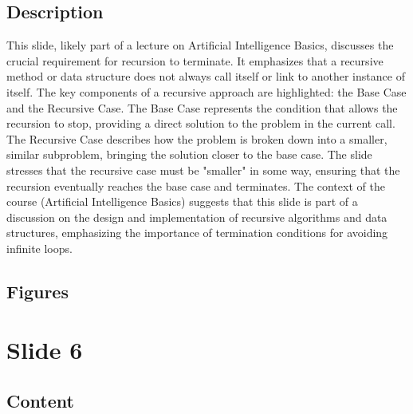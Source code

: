 \documentclass{article}%
\begin{document}
\subsection{Description}%
This slide, likely part of a lecture on Artificial Intelligence Basics, discusses the crucial requirement for recursion to terminate.  It emphasizes that a recursive method or data structure does not always call itself or link to another instance of itself.  The key components of a recursive approach are highlighted: the Base Case and the Recursive Case.  The Base Case represents the condition that allows the recursion to stop, providing a direct solution to the problem in the current call.  The Recursive Case describes how the problem is broken down into a smaller, similar subproblem, bringing the solution closer to the base case.  The slide stresses that the recursive case must be "smaller" in some way, ensuring that the recursion eventually reaches the base case and terminates.  The context of the course (Artificial Intelligence Basics) suggests that this slide is part of a discussion on the design and implementation of recursive algorithms and data structures, emphasizing the importance of termination conditions for avoiding infinite loops.%
\subsection{Figures}%
\begin{figure}[H]%
\centering%
\end{figure}

%
\newpage%
\section{Slide 6}%
\label{sec:Slide6}%
\subsection{Content}%
\end{document}
